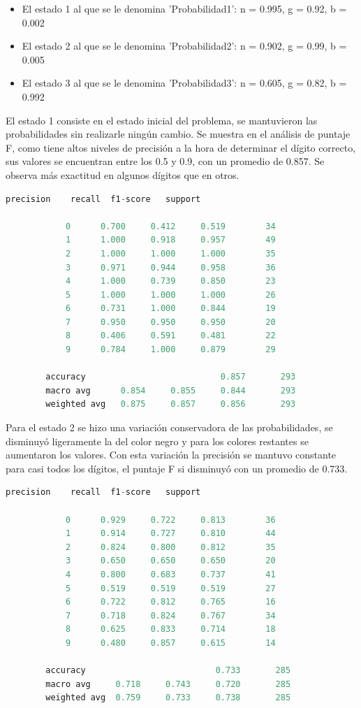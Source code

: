 \documentclass{article}
\begin{document}
\begin{itemize}
	\item El estado 1 al que se le denomina 'Probabilidad1': n = 0.995, g = 0.92, b = 0.002
	\item El estado 2 al que se le denomina 'Probabilidad2': n = 0.902, g = 0.99, b = 0.005
	\item El estado 3 al que se le denomina 'Probabilidad3': n = 0.605, g = 0.82, b = 0.992
\end{itemize}

El estado 1 consiste en el estado inicial del problema, se mantuvieron las probabilidades sin realizarle ningún cambio. Se muestra en el análisis de puntaje F, como tiene altos niveles de precisión a la hora de determinar el dígito correcto, sus valores se encuentran entre los 0.5 y 0.9, con un promedio de 0.857. Se observa más exactitud en algunos dígitos que en otros.   
\begin{lstlisting}[language=Python]
			precision    recall  f1-score   support
			
			0      0.700     0.412     0.519        34
			1      1.000     0.918     0.957        49
			2      1.000     1.000     1.000        35
			3      0.971     0.944     0.958        36
			4      1.000     0.739     0.850        23
			5      1.000     1.000     1.000        26
			6      0.731     1.000     0.844        19
			7      0.950     0.950     0.950        20
			8      0.406     0.591     0.481        22
			9      0.784     1.000     0.879        29
			
		accuracy                           0.857       293
		macro avg      0.854     0.855     0.844       293
		weighted avg   0.875     0.857     0.856       293
\end{lstlisting}

Para el estado 2 se hizo una variación conservadora de las probabilidades, se disminuyó ligeramente la del color negro y para los colores restantes se aumentaron los valores. Con esta variación la precisión se mantuvo constante para casi todos los dígitos, el puntaje F si disminuyó con un promedio de 0.733.  
\begin{lstlisting}[language=Python]
			precision    recall  f1-score   support

			0      0.929     0.722     0.813        36
			1      0.914     0.727     0.810        44
			2      0.824     0.800     0.812        35
			3      0.650     0.650     0.650        20
			4      0.800     0.683     0.737        41
			5      0.519     0.519     0.519        27
			6      0.722     0.812     0.765        16
			7      0.718     0.824     0.767        34
			8      0.625     0.833     0.714        18
			9      0.480     0.857     0.615        14

		accuracy                          0.733       285
		macro avg     0.718     0.743     0.720       285
		weighted avg  0.759     0.733     0.738       285
\end{lstlisting}
\end{document}
